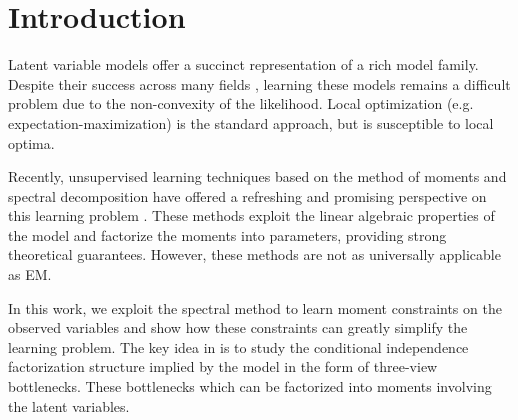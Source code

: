\section{Introduction}
\label{sec:introduction}

Latent variable models offer a succinct representation of a rich model
family. 
Despite their success across many fields
\cite{quattoni04crf,haghighi06prototype,liang06discrimative,kirkpatrick10painless},
learning these models remains a difficult problem due to the
non-convexity of the likelihood. Local optimization (e.g.
expectation-maximization) is the standard approach, but is susceptible
to local optima.

Recently, unsupervised learning techniques based on the method of moments and
spectral decomposition have offered a refreshing and promising perspective on
this learning problem \citep{hsu09spectral,anandkumar11tree,anandkumar12moments,anandkumar12lda,hsu12identifiability,balle11transducer,balle12automata}.
These methods exploit the linear algebraic properties of the model and
factorize the moments into parameters, providing strong theoretical guarantees.
However, these methods are not as universally applicable as EM.

In this work, we exploit the spectral method to learn moment constraints
on the observed variables and show how these constraints can greatly
simplify the learning problem.
The key idea in
\citet{anandkumar12moments,anandkumar13tensor} is to study the conditional
independence factorization structure implied by the model in the form of 
three-view bottlenecks. These bottlenecks which can be factorized into
moments involving the latent variables\vague.

